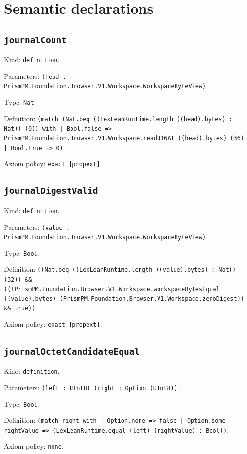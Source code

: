 \documentclass[11pt]{article}
\begin{document}
\section*{Semantic declarations}
\subsection*{\texttt{journalCount}}
\noindent Kind: \texttt{definition}.\par
\noindent Parameters: \texttt{(head : PrismPM.Foundation.Browser.V1.Workspace.WorkspaceByteView)}.\par
\noindent Type: \texttt{Nat}.\par
\noindent Definition: \texttt{(match (Nat.beq ((LexLeanRuntime.length ((head).bytes) : Nat)) (0)) with | Bool.false => PrismPM.Foundation.Browser.V1.Workspace.readU16At ((head).bytes) (36) | Bool.true => 0)}.\par
\noindent Axiom policy: \texttt{exact [propext]}.\par
\subsection*{\texttt{journalDigestValid}}
\noindent Kind: \texttt{definition}.\par
\noindent Parameters: \texttt{(value : PrismPM.Foundation.Browser.V1.Workspace.WorkspaceByteView)}.\par
\noindent Type: \texttt{Bool}.\par
\noindent Definition: \texttt{((Nat.beq ((LexLeanRuntime.length ((value).bytes) : Nat)) (32)) \&\& ((!PrismPM.Foundation.Browser.V1.Workspace.workspaceBytesEqual ((value).bytes) (PrismPM.Foundation.Browser.V1.Workspace.zeroDigest)) \&\& true))}.\par
\noindent Axiom policy: \texttt{exact [propext]}.\par
\subsection*{\texttt{journalOctetCandidateEqual}}
\noindent Kind: \texttt{definition}.\par
\noindent Parameters: \texttt{(left : UInt8) (right : Option (UInt8))}.\par
\noindent Type: \texttt{Bool}.\par
\noindent Definition: \texttt{(match right with | Option.none => false | Option.some rightValue => (LexLeanRuntime.equal (left) (rightValue) : Bool))}.\par
\noindent Axiom policy: \texttt{none}.\par
\end{document}
